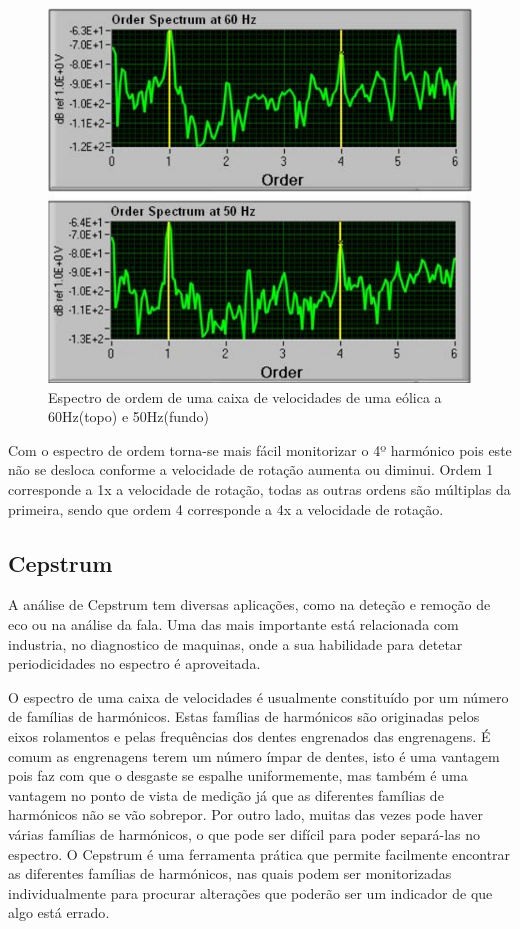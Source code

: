 \begin{figure}[H]
\centering
\includegraphics[scale=0.3]{figs/order_spectrum}
\caption{Espectro de ordem de uma caixa de velocidades de uma eólica a 60Hz(topo) e 50Hz(fundo)}\label{power espectrum 2}
\end{figure}


Com o espectro de ordem torna-se mais fácil monitorizar o 4º harmónico pois este não se desloca conforme a velocidade de rotação aumenta ou diminui. Ordem 1 corresponde a 1x a velocidade de rotação, todas as outras ordens são múltiplas da primeira, sendo que ordem 4 corresponde a 4x a velocidade de rotação.

\subsection{Cepstrum}

A análise de Cepstrum tem diversas aplicações, como na deteção e remoção de eco ou na análise da fala. Uma das mais importante está relacionada com industria, no diagnostico de maquinas, onde a sua habilidade para detetar periodicidades no espectro é aproveitada.

O espectro de uma caixa de velocidades é usualmente constituído por um número de famílias de harmónicos. Estas famílias de harmónicos são originadas pelos eixos rolamentos e pelas frequências dos dentes engrenados das engrenagens. É comum as engrenagens terem um número ímpar de dentes, isto é uma vantagem pois faz com que o desgaste se espalhe uniformemente, mas também é uma vantagem no ponto de vista de medição já que as diferentes famílias de harmónicos não se vão sobrepor. Por outro lado, muitas das vezes pode haver várias famílias de harmónicos, o que pode ser difícil para poder separá-las no espectro. O Cepstrum é uma ferramenta prática que permite facilmente encontrar as diferentes famílias de harmónicos, nas quais podem ser monitorizadas individualmente para procurar alterações que poderão ser um indicador de que algo está errado\cite{Notes2}.

